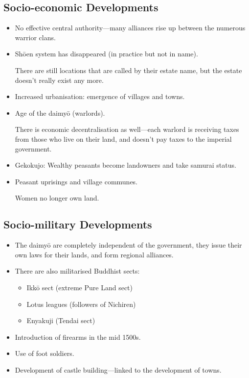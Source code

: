 \documentclass[class=article, crop=false]{standalone}
\begin{document}
  \subsection{Socio-economic Developments}
  \begin{itemize}
    \item No effective central authority---many alliances rise up between the numerous warrior clans.
    \item Sh\=oen system has disappeared (in practice but not in name).
    \begin{note}{}
      There are still locations that are called by their estate name, but the estate doesn't really exist any more.
    \end{note}
    \item Increased urbanisation: emergence of villages and towns.
    \item Age of the daimy\=o (warlords).
    \begin{note}{}
      There is economic decentralisation as well---each warlord is receiving taxes from those who live on their land, and doesn't pay taxes to the imperial government.
    \end{note}
    \item Gekokujo: Wealthy peasants become landowners and take samurai status.
    \item Peasant uprisings and village communes.
    \begin{note}{}
      Women no longer own land.
    \end{note}
  \end{itemize}
  \subsection{Socio-military Developments}
  \begin{itemize}
    \item The daimy\=o are completely independent of the government, they issue their own laws for their lands, and form regional alliances.
    \item There are also militarised Buddhist sects:
    \begin{itemize}
      \item Ikk\=o sect (extreme Pure Land sect)
      \item Lotus leagues (followers of Nichiren)
      \item Enyakuji (Tendai sect)
    \end{itemize}
    \item Introduction of firearms in the mid 1500s.
    \item Use of foot soldiers.
    \item Development of castle building---linked to the development of towns.
  \end{itemize}
\end{document}

